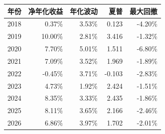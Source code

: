 \begin{tabular}{lrrrr}
\toprule
年份 & 净年化收益 & 年化波动 & 夏普 & 最大回撤\\\midrule
2018 & 0.37\% & 3.53\% & 0.123 & -4.20\%\\
2019 & 10.00\% & 2.81\% & 3.416 & -1.32\%\\
2020 & 7.70\% & 5.01\% & 1.511 & -6.80\%\\
2021 & 7.09\% & 3.52\% & 1.969 & -1.89\%\\
2022 & -0.45\% & 3.71\% & -0.103 & -2.83\%\\
2023 & 4.73\% & 1.92\% & 2.424 & -1.51\%\\
2024 & 8.35\% & 3.33\% & 2.435 & -1.86\%\\
2025 & 8.11\% & 3.65\% & 2.166 & -2.46\%\\
2026 & 6.86\% & 3.97\% & 1.702 & -2.01\%\\
\bottomrule
\end{tabular}
